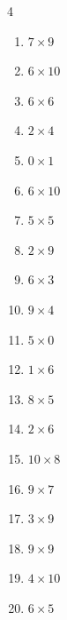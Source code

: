 \begin{multicols}{4}
\begin{enumerate}
  \item $7\times 9$
        \phantom{$=63$}

  \item $6\times 10$
        \phantom{$=60$}

  \item $6\times 6$
        \phantom{$=36$}

  \item $2\times 4$
        \phantom{$=8$}

  \item $0\times 1$
        \phantom{$=0$}

  \item $6\times 10$
        \phantom{$=60$}

  \item $5\times 5$
        \phantom{$=25$}

  \item $2\times 9$
        \phantom{$=18$}

  \item $6\times 3$
        \phantom{$=18$}

  \item $9\times 4$
        \phantom{$=36$}

  \item $5\times 0$
        \phantom{$=0$}

  \item $1\times 6$
        \phantom{$=6$}

  \item $8\times 5$
        \phantom{$=40$}

\columnbreak %

\resetques

  \item $2\times 6$
        \phantom{$=12$}

  \item $10\times 8$
        \phantom{$=80$}

  \item $9\times 7$
        \phantom{$=63$}

  \item $3\times 9$
        \phantom{$=27$}

  \item $9\times 9$
        \phantom{$=81$}

  \item $4\times 10$
        \phantom{$=40$}

  \item $6\times 5$
        \phantom{$=30$}


\end{enumerate}
\end{multicols}
